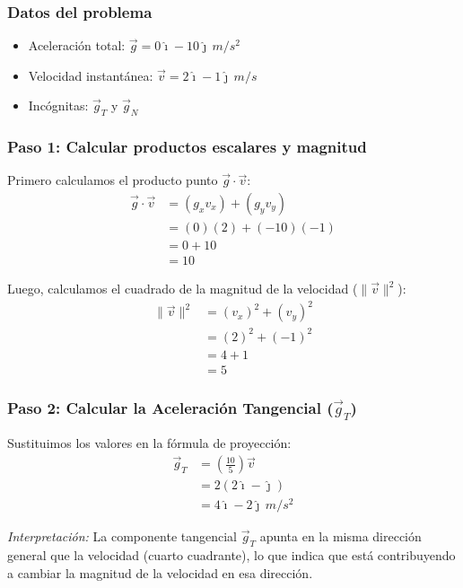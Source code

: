 \documentclass[12pt, a4paper]{article}
\begin{document}
\subsubsection*{Datos del problema}
\begin{itemize}[leftmargin=2cm]
    \item Aceleración total: $\vec{g} = 0\hat{\imath} - 10\hat{\jmath} \, \si{m/s^2}$
    \item Velocidad instantánea: $\vec{v} = 2\hat{\imath} - 1\hat{\jmath} \, \si{m/s}$
    \item Incógnitas: $\vec{g}_T$ y $\vec{g}_N$
\end{itemize}

\subsubsection*{Paso 1: Calcular productos escalares y magnitud}
Primero calculamos el producto punto $\vec{g} \cdot \vec{v}$:
\begin{align*}
\vec{g} \cdot \vec{v} &= (g_x v_x) + (g_y v_y) \\
&= (0)(2) + (-10)(-1) \\
&= 0 + 10 \\
&= 10
\end{align*}

Luego, calculamos el cuadrado de la magnitud de la velocidad ($\|\vec{v}\|^2$):
\begin{align*}
\|\vec{v}\|^2 &= (v_x)^2 + (v_y)^2 \\
&= (2)^2 + (-1)^2 \\
&= 4 + 1 \\
&= 5
\end{align*}

\subsubsection*{Paso 2: Calcular la Aceleración Tangencial ($\vec{g}_T$)}
Sustituimos los valores en la fórmula de proyección:
\begin{align*}
\vec{g}_T &= \left( \frac{10}{5} \right) \vec{v} \\
&= 2 (2\hat{\imath} - \hat{\jmath}) \\
&= 4\hat{\imath} - 2\hat{\jmath} \, \si{m/s^2}
\end{align*}

\textit{Interpretación:} La componente tangencial $\vec{g}_T$ apunta en la misma dirección general que la velocidad (cuarto cuadrante), lo que indica que está contribuyendo a cambiar la magnitud de la velocidad en esa dirección.
\end{document}
